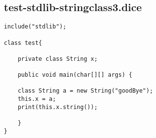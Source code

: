 \subsection{test-stdlib-stringclass3.dice}
\begin{verbatim}
include("stdlib");

class test{
	
	private class String x;

	public void main(char[][] args) {

	class String a = new String("goodBye");
	this.x = a;
	print(this.x.string());
	
	}
}
\end{verbatim}